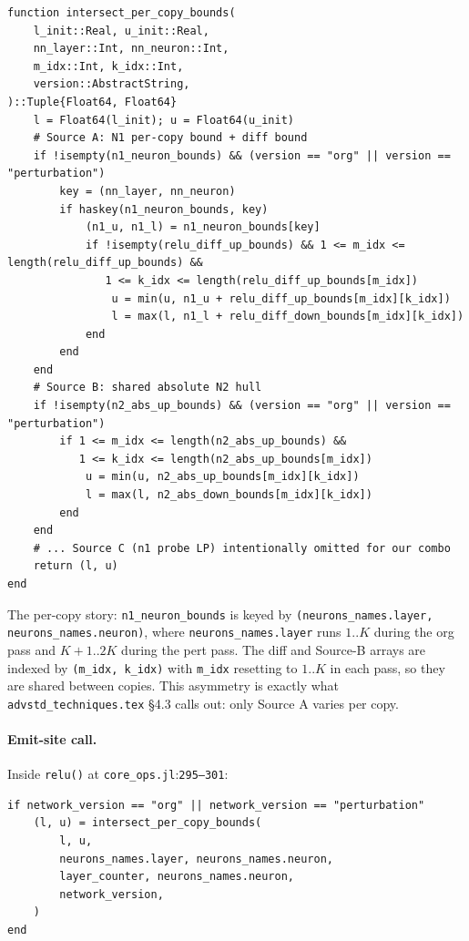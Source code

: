 \documentclass[11pt]{article}
\newcommand{\src}[1]{\texttt{\small #1}}
\newcommand{\fileline}[2]{\src{#1}:\src{#2}}
\begin{document}
\begin{lstlisting}[style=jl]
function intersect_per_copy_bounds(
    l_init::Real, u_init::Real,
    nn_layer::Int, nn_neuron::Int,
    m_idx::Int, k_idx::Int,
    version::AbstractString,
)::Tuple{Float64, Float64}
    l = Float64(l_init); u = Float64(u_init)
    # Source A: N1 per-copy bound + diff bound
    if !isempty(n1_neuron_bounds) && (version == "org" || version == "perturbation")
        key = (nn_layer, nn_neuron)
        if haskey(n1_neuron_bounds, key)
            (n1_u, n1_l) = n1_neuron_bounds[key]
            if !isempty(relu_diff_up_bounds) && 1 <= m_idx <= length(relu_diff_up_bounds) &&
               1 <= k_idx <= length(relu_diff_up_bounds[m_idx])
                u = min(u, n1_u + relu_diff_up_bounds[m_idx][k_idx])
                l = max(l, n1_l + relu_diff_down_bounds[m_idx][k_idx])
            end
        end
    end
    # Source B: shared absolute N2 hull
    if !isempty(n2_abs_up_bounds) && (version == "org" || version == "perturbation")
        if 1 <= m_idx <= length(n2_abs_up_bounds) &&
           1 <= k_idx <= length(n2_abs_up_bounds[m_idx])
            u = min(u, n2_abs_up_bounds[m_idx][k_idx])
            l = max(l, n2_abs_down_bounds[m_idx][k_idx])
        end
    end
    # ... Source C (n1 probe LP) intentionally omitted for our combo
    return (l, u)
end
\end{lstlisting}

The per-copy story: \src{n1\_neuron\_bounds} is keyed by
\src{(neurons\_names.layer, neurons\_names.neuron)}, where
\src{neurons\_names.layer} runs $1..K$ during the org pass and
$K{+}1..2K$ during the pert pass. The diff and Source-B arrays are
indexed by \src{(m\_idx, k\_idx)} with \src{m\_idx} resetting to
$1..K$ in each pass, so they are shared between copies. This
asymmetry is exactly what \texttt{advstd\_techniques.tex} \S 4.3
calls out: only Source A varies per copy.

\paragraph{Emit-site call.}
Inside \src{relu()} at \fileline{core\_ops.jl}{295--301}:

\begin{lstlisting}[style=jl]
if network_version == "org" || network_version == "perturbation"
    (l, u) = intersect_per_copy_bounds(
        l, u,
        neurons_names.layer, neurons_names.neuron,
        layer_counter, neurons_names.neuron,
        network_version,
    )
end
\end{lstlisting}
\end{document}
